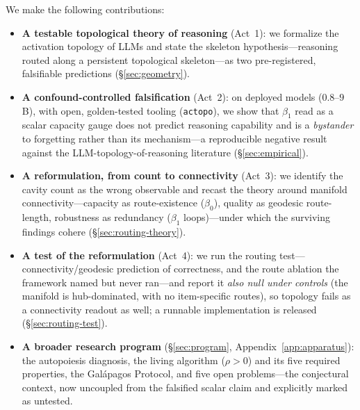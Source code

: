 \documentclass{article}
\begin{document}
We make the following contributions:

\begin{itemize}
    \item \textbf{A testable topological theory of reasoning} (Act~1): we formalize the activation
    topology of LLMs and state the skeleton hypothesis---reasoning routed along a persistent
    topological skeleton---as two pre-registered, falsifiable predictions (\S\ref{sec:geometry}).

    \item \textbf{A confound-controlled falsification} (Act~2): on deployed models ($0.8$--$9$B), with
    open, golden-tested tooling (\texttt{actopo}), we show that $\beta_1$ read as a scalar capacity
    gauge does not predict reasoning capability and is a \emph{bystander} to forgetting rather than its
    mechanism---a reproducible negative result against the LLM-topology-of-reasoning literature
    (\S\ref{sec:empirical}).

    \item \textbf{A reformulation, from count to connectivity} (Act~3): we identify the cavity count as
    the wrong observable and recast the theory around manifold connectivity---capacity as
    route-existence ($\beta_0$), quality as geodesic route-length, robustness as redundancy ($\beta_1$
    loops)---under which the surviving findings cohere (\S\ref{sec:routing-theory}).

    \item \textbf{A test of the reformulation} (Act~4): we run the routing test---connectivity/geodesic
    prediction of correctness, and the route ablation the framework named but never ran---and report it
    \emph{also null under controls} (the manifold is hub-dominated, with no item-specific routes), so
    topology fails as a connectivity readout as well; a runnable implementation is released
    (\S\ref{sec:routing-test}).

    \item \textbf{A broader research program} (\S\ref{sec:program}, Appendix~\ref{app:apparatus}): the
    autopoiesis diagnosis, the living algorithm ($\rho>0$) and its five required properties, the
    Gal\'apagos Protocol, and five open problems---the conjectural context, now uncoupled from the
    falsified scalar claim and explicitly marked as untested.
\end{itemize}
\end{document}

